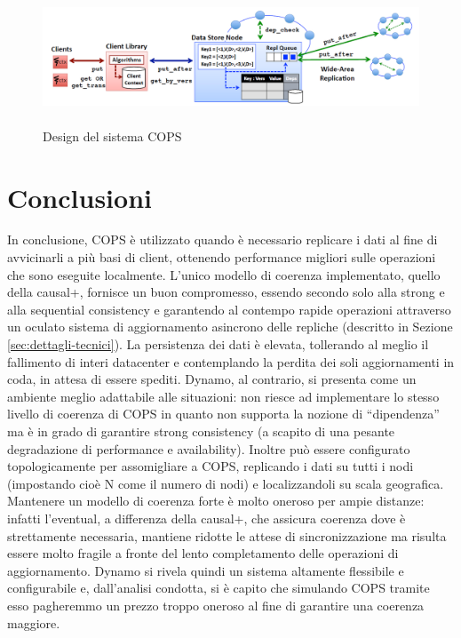 \documentclass[twoside]{article}
\begin{document}
\begin{multicols}{2}
\begin{figure}[t]
\centering
\includegraphics[width=\textwidth,height=4cm]{img/COPSdesign.png}
\caption{Design del sistema COPS}
\label{fig:COPSdesign}
\end{figure}

\section{Conclusioni}
In conclusione, COPS è utilizzato quando è necessario replicare i dati al fine di avvicinarli a più basi di client, ottenendo performance migliori sulle operazioni che sono eseguite localmente. L'unico modello di coerenza implementato, quello della causal+, fornisce un buon compromesso, essendo secondo solo alla strong e alla sequential consistency e garantendo al contempo rapide operazioni attraverso un oculato sistema di aggiornamento asincrono delle repliche (descritto in Sezione \ref{sec:dettagli-tecnici}). La persistenza dei dati è elevata, tollerando al meglio il fallimento di interi datacenter e contemplando la perdita dei soli aggiornamenti in coda, in attesa di essere spediti.
Dynamo, al contrario, si presenta come un ambiente meglio adattabile alle situazioni: non riesce ad implementare lo stesso livello di coerenza di COPS in quanto non supporta la nozione di ``dipendenza'' ma è in grado di garantire strong consistency (a scapito di una pesante degradazione di performance e availability). Inoltre può essere configurato topologicamente per assomigliare a COPS, replicando i dati su tutti i nodi (impostando cioè N come il numero di nodi) e localizzandoli su scala geografica. Mantenere un modello di coerenza forte è molto oneroso per ampie distanze: infatti l'eventual, a differenza della causal+, che assicura coerenza dove è strettamente necessaria, mantiene ridotte le attese di sincronizzazione ma risulta essere molto fragile a fronte del lento completamento delle operazioni di aggiornamento.
Dynamo si rivela quindi un sistema altamente flessibile e configurabile e, dall'analisi condotta, si è capito che simulando COPS tramite esso pagheremmo un prezzo troppo oneroso al fine di garantire una coerenza maggiore.


\end{multicols}
\end{document}
